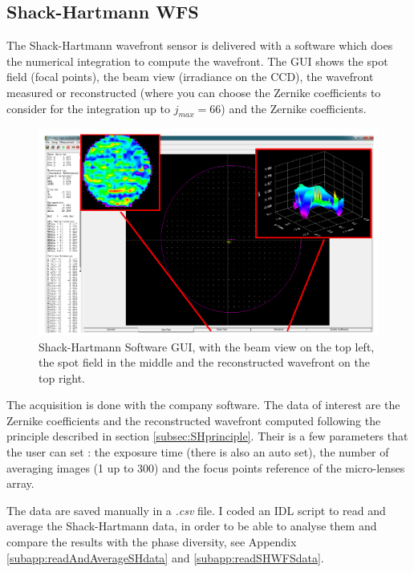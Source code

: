 \subsection{Shack-Hartmann WFS}
\label{subsec:acquisSHwfs}

The Shack-Hartmann wavefront sensor is delivered with a software which does the numerical integration to compute
the wavefront. The GUI shows the spot field (focal points), the beam view (irradiance on the
CCD), the wavefront measured or reconstructed (where you can choose the Zernike coefficients
to consider for the integration up to $j_{max}=66$) and the Zernike coefficients.

\begin{figure}
\begin{center}
\includegraphics[width=\textwidth,angle=0]{Figures/SHWFS_GUI}
\decoRule
\caption{Shack-Hartmann Software GUI, with the  beam view on the top left, the spot field in the middle and the reconstructed wavefront on the top right.}
\label{fig:}
\end{center}
\end{figure}

The acquisition is done with the company software. The data of interest are the Zernike coefficients and the reconstructed wavefront computed following the principle described in section \ref{subsec:SHprinciple}. Their is a few parameters that the user can set : the exposure time (there is also an auto set), the number of averaging images (1 up to 300) and the focus points reference of the micro-lenses array. 

The data are saved manually in a \textit{.csv} file. I coded an IDL script to read and average the Shack-Hartmann data, in order to be able to analyse them and compare the results with the phase diversity, see Appendix \ref{subapp:readAndAverageSHdata} and \ref{subapp:readSHWFSdata}. 

